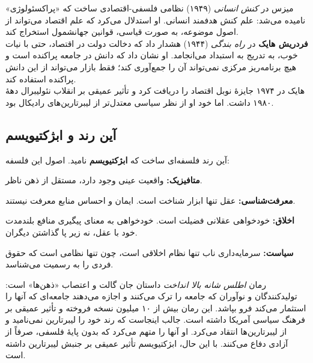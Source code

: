 میزس در \textit{کنش انسانی} (۱۹۴۹) نظامی فلسفی-اقتصادی ساخت که «پراکسئولوژی» نامیده می‌شد: علم کنش هدفمند انسانی. او استدلال می‌کرد که علم اقتصاد می‌تواند از اصول موضوعه، به صورت قیاسی، قوانین جهانشمول استخراج کند.\\

\textbf{فردریش هایک} در \textit{راه بندگی} (۱۹۴۴) هشدار داد که دخالت دولت در اقتصاد، حتی با نیات خوب، به تدریج به استبداد می‌انجامد. او نشان داد که دانش در جامعه پراکنده است و هیچ برنامه‌ریز مرکزی نمی‌تواند آن را جمع‌آوری کند؛ فقط بازار می‌تواند از این دانش پراکنده استفاده کند.\\

هایک در ۱۹۷۴ جایزهٔ نوبل اقتصاد را دریافت کرد و تأثیر عمیقی بر انقلاب نئولیبرال دههٔ ۱۹۸۰ داشت. اما خود او از نظر سیاسی معتدل‌تر از لیبرتارین‌های رادیکال بود.\\

\subsection{آین رند و ابژکتیویسم}


آین رند فلسفه‌ای ساخت که \textbf{ابژکتیویسم} نامید. اصول این فلسفه:

\textbf{متافیزیک:} واقعیت عینی وجود دارد، مستقل از ذهن ناظر.

\textbf{معرفت‌شناسی:} عقل تنها ابزار شناخت است. ایمان و احساس منابع معرفت نیستند.

\textbf{اخلاق:} خودخواهی عقلانی فضیلت است. خودخواهی به معنای پیگیری منافع بلندمدت خود با عقل، نه زیر پا گذاشتن دیگران.

\textbf{سیاست:} سرمایه‌داری ناب تنها نظام اخلاقی است، چون تنها نظامی است که حقوق فردی را به رسمیت می‌شناسد.

رمان \textit{اطلس شانه بالا انداخت} داستان جان گالت و اعتصاب «ذهن‌ها» است: تولیدکنندگان و نوآوران که جامعه را ترک می‌کنند و اجازه می‌دهند جامعه‌ای که آنها را استثمار می‌کند فرو بپاشد. این رمان بیش از ۱۰ میلیون نسخه فروخته و تأثیر عمیقی بر فرهنگ سیاسی آمریکا داشته است.
جالب اینجاست که رند خود را لیبرتارین نمی‌نامید و از لیبرتارین‌ها انتقاد می‌کرد. او آنها را متهم می‌کرد که بدون پایهٔ فلسفی، صرفاً از آزادی دفاع می‌کنند. با این حال، ابژکتیویسم تأثیر عمیقی بر جنبش لیبرتارین داشته است.

